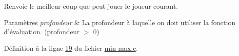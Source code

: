 Renvoie le meilleur coup que peut jouer le joueur courant. 


\begin{DoxyParams}{Paramètres}
{\em profondeur} & La profondeur à laquelle on doit utiliser la fonction d'évaluation. (profondeur $>$ 0) \\
\hline
\end{DoxyParams}


Définition à la ligne \hyperlink{min-max_8c_source_l00019}{19} du fichier \hyperlink{min-max_8c_source}{min-\/max.c}.

